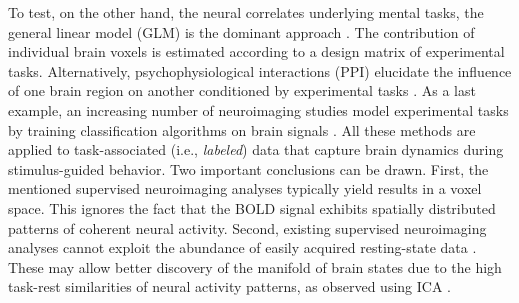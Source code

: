 \documentclass{article} %
\begin{document}
To test, on the other hand,
the neural correlates underlying mental tasks,
the general linear model (GLM) is the dominant approach \cite{friston94}.
The contribution of
individual brain voxels is estimated
according to a design matrix of experimental tasks.
Alternatively, psychophysiological interactions (PPI)
elucidate the influence of one brain region on another conditioned
by experimental tasks \cite{friston97}.
As a last example, an increasing number of
neuroimaging studies model
experimental tasks by training classification algorithms on brain signals
\cite{poldrack09decoding}.
All these methods are applied to task-associated (i.e., \textit{labeled})
data that capture brain dynamics
during stimulus-guided behavior.
Two important conclusions can be drawn.
First, the mentioned supervised neuroimaging analyses typically yield
results in a voxel space.
This ignores the fact that the BOLD
signal exhibits spatially distributed patterns
of coherent neural activity.
%
Second, existing supervised neuroimaging analyses
cannot exploit the abundance
of easily acquired resting-state data \cite{biswaldiscovery}.
These may allow better discovery of
the manifold of brain states
due to the high task-rest similarities of neural activity patterns,
as observed using ICA \cite{smith2009}.
\end{document}
